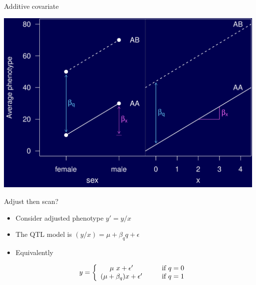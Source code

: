 \documentclass[12pt]{article}
\newcommand{\headsize}{\fontsize{35}{35} \selectfont}
\newcommand{\smallsize}{\fontsize{25}{30} \selectfont}
\begin{document}
\newpage

\headsize \color{myyellow}
\hfill \begin{minipage}{5.75in}
\centering
Additive covariate
\end{minipage}

\vfill

\centerline{\includegraphics{FigsA/addcovar.pdf}}

\newpage

\headsize \color{myyellow}
\hfill \begin{minipage}{5.75in}
\centering
Adjust then scan?
\end{minipage}

\vspace{15mm}

\color{mywhite} \smallsize

\hspace{0.5in} \begin{minipage}{9.5in}
  \begin{itemize}
    \itemsep18pt
  \item Consider adjusted phenotype $y' = y/x$
  \item The QTL model is $(y/x) = \mu + \beta_q q + \epsilon$
  \item Equivalently

$$y = \left\{ \begin{array}{c@{\hspace{1cm}}l} \mu \ x + \epsilon' & \text{if
      $q = 0$} \\
    (\mu + \beta_q) x + \epsilon' & \text{if $q =
      1$} \end{array} \right. $$
\end{itemize}
\end{minipage}
\end{document}
